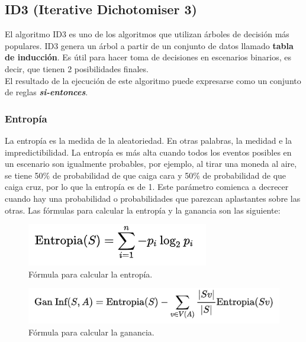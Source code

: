 \subsection{ID3 (Iterative Dichotomiser 3)} \label{id3}

El algoritmo ID3 es uno de los algoritmos que utilizan árboles de decisión más populares. ID3 genera un árbol a partir de un conjunto de datos llamado \textbf{tabla de inducción}. Es útil para hacer toma de decisiones en escenarios binarios, es decir, que tienen 2 posibilidades finales.\\

El resultado de la ejecución de este algoritmo puede expresarse como un conjunto de reglas \textbf{\textit{si-entonces}}.

\subsubsection{Entropía}
La entropía es la medida de la aleatoriedad. En otras palabras, la medidad e la impredictibilidad. La entropía es más alta cuando todos los eventos posibles en un escenario son igualmente probables, por ejemplo, al tirar una moneda al aire, se tiene 50\% de probabilidad de que caiga cara y 50\% de probabilidad de que caiga cruz, por lo que la entropía es de 1. Este parámetro comienca a decrecer cuando hay una probabilidad o probabilidades que parezcan aplastantes sobre las otras. Las fórmulas para calcular la entropía y la ganancia son las siguiente:\\

\begin{figure}[!htbp]
	\hypertarget{fig:formula-entropia}{\hspace{1pt}}
	\begin{center}
		\includegraphics{capitulo2/images/formula-entropia.png}
		\caption{Fórmula para calcular la entropía.}
		\label{fig:formula-entropia}
	\end{center}
\end{figure}

\begin{figure}[!htbp]
	\hypertarget{fig:formula-ganancia}{\hspace{1pt}}
	\begin{center}
		\includegraphics{capitulo2/images/formula-ganancia.png}
		\caption{Fórmula para calcular la ganancia.}
		\label{fig:formula-ganancia}
	\end{center}
\end{figure}


